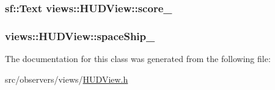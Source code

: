 \hypertarget{classviews_1_1HUDView_ab6665535a79da68caf11bb31f52afe85}{
\subsubsection[{score\-\_\-}]{\setlength{\rightskip}{0pt plus 5cm}sf\-::\-Text {\bf views\-::\-H\-U\-D\-View\-::score\-\_\-}}}\label{d0/d97/classviews_1_1HUDView_ab6665535a79da68caf11bb31f52afe85}
\hypertarget{classviews_1_1HUDView_a0016ba3cfd9731897e5f2c4586bca6fb}{
\subsubsection[{space\-Ship\-\_\-}]{ {\bf views\-::\-H\-U\-D\-View\-::space\-Ship\-\_\-}}}\label{d0/d97/classviews_1_1HUDView_a0016ba3cfd9731897e5f2c4586bca6fb}


\-The documentation for this class was generated from the following file\-:\begin{DoxyCompactItemize}
\item 
src/observers/views/\hyperlink{HUDView_8h}{\-H\-U\-D\-View.\-h}\end{DoxyCompactItemize}
